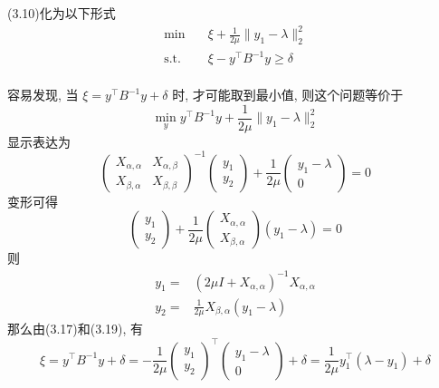\documentclass[UTF8]{ctexart}
\newcommand{\s}{\quad}
\newcommand{\p}{\paragraph{}\s}
\newcommand{\equSplit}[1]{\begin{equation}\begin{split}#1\end{split}\end{equation}}
\newcommand{\Tst}{\text{s.t.}\s}
\newcommand{\norm}[1]{\lVert#1\rVert}
\numberwithin{equation}{section}
\begin{document}
		(3.10)化为以下形式
		\equSplit{
			\min\s&\xi+\frac{1}{2\mu}\norm{y_1-\lambda}^2_2\\
			\Tst&\xi-y^\top B^{-1}y\geq \delta
		}

		\paragraph{}\quad 容易发现, 当 $\xi = y^\top B^{-1}y + \delta$ 时, 才可能取到最小值, 则这个问题等价于 
			\begin{equation}
				\min_y y^\top B^{-1}y + \frac{1}{2\mu} \norm{y_1-\lambda}^2_2
			\end{equation}
			显示表达为 
			\begin{equation}
				{\begin{pmatrix}
					X_{\alpha, \alpha} & X_{\alpha, \beta}\\
					X_{\beta, \alpha} & X_{\beta, \beta}
				\end{pmatrix}}^{-1}
				\begin{pmatrix}
					y_1 \\ y_2
				\end{pmatrix}
				+ \frac{1}{2\mu}
				\begin{pmatrix}
					y_1 - \lambda \\ 0
				\end{pmatrix}
				= 0
			\end{equation}
			变形可得 
			\begin{equation}
				\begin{pmatrix}
					y_1 \\ y_2
				\end{pmatrix}
				+ \frac{1}{2\mu}
				\begin{pmatrix}
					X_{\alpha, \alpha} \\ X_{\beta, \alpha}
				\end{pmatrix}
				(y_1 - \lambda) = 0
			\end{equation}
			则 
			\begin{equation}
				\begin{split}
					y_1 = & (2 \mu I + X_{\alpha, \alpha})^{-1} X_{\alpha, \alpha}\\
					y_2 = & \frac{1}{2\mu} X_{\beta, \alpha} (y_1 - \lambda)
				\end{split}
			\end{equation}
			那么由(3.17)和(3.19), 有
			\begin{equation}
				\xi = y^\top B^{-1}y + \delta = 
				- \frac{1}{2\mu}
				\begin{pmatrix}
					y_1 \\ y_2
				\end{pmatrix}^\top
				\begin{pmatrix}
					y_1 - \lambda \\ 0
				\end{pmatrix}
				+ \delta = 
				\frac{1}{2 \mu} y_1^\top (\lambda - y_1) + \delta
			\end{equation}
			
\end{document}
